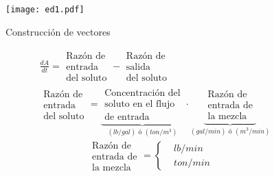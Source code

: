 \begin{figure}[h!]
	\centering
	\texttt{[image: ed1.pdf]}
	\caption{Construcción de vectores}
\end{figure}
\begin{align*}
    &\frac{dA}{dt}=\begin{matrix}
        \text{Razón de}\\
        \text{entrada}\\
        \text{del soluto}
    \end{matrix}-\begin{matrix}
        \text{Razón de}\\
        \text{salida}\\
        \text{del soluto}
    \end{matrix}\\
    &\begin{matrix}
        \text{Razón de}\\
        \text{entrada}\\
        \text{del soluto}
    \end{matrix}=\underbrace{\begin{matrix}
        \text{Concentración del}\\
        \text{soluto en el flujo}\\
        \text{de entrada}
    \end{matrix}}_{(lb/gal)\text{ ó }(ton/m^3)}
    \cdot \underbrace{\begin{matrix}
        \text{Razón de}\\
        \text{entrada de}\\
        \text{la mezcla}
    \end{matrix}}_{(gal/min)\text{ ó }(m^3/min)}
\end{align*}
\begin{equation*}
    \begin{matrix}
        \text{Razón de}\\
        \text{entrada de}\\
        \text{la mezcla}
    \end{matrix}=\begin{cases}
        &lb/min\\
        &ton/min
    \end{cases}
\end{equation*}

